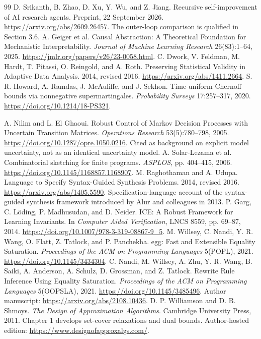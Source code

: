 \documentclass[11pt,oneside,openany]{book}
\numberwithin{equation}{section}
\begin{document}
\begin{thebibliography}{99}
 D. Srikanth, B. Zhao, D. Xu, Y. Wu, and Z. Jiang. Recursive self-improvement of AI research agents. Preprint, 22 September 2026. \url{https://arxiv.org/abs/2609.26457}. The outer-loop comparison is qualified in Section 3.6.
 A. Geiger et al. Causal Abstraction: A Theoretical Foundation for Mechanistic Interpretability. \emph{Journal of Machine Learning Research} 26(83):1--64, 2025. \url{https://jmlr.org/papers/v26/23-0058.html}.
 C. Dwork, V. Feldman, M. Hardt, T. Pitassi, O. Reingold, and A. Roth. Preserving Statistical Validity in Adaptive Data Analysis. 2014, revised 2016. \url{https://arxiv.org/abs/1411.2664}.
 S. R. Howard, A. Ramdas, J. McAuliffe, and J. Sekhon. Time-uniform Chernoff bounds via nonnegative supermartingales. \emph{Probability Surveys} 17:257--317, 2020. \url{https://doi.org/10.1214/18-PS321}.

 A. Nilim and L. El Ghaoui. Robust Control of Markov Decision Processes with Uncertain Transition Matrices. \emph{Operations Research} 53(5):780--798, 2005. \url{https://doi.org/10.1287/opre.1050.0216}. Cited as background on explicit model uncertainty, not as an identical uncertainty model.
 A. Solar-Lezama et al. Combinatorial sketching for finite programs. \emph{ASPLOS}, pp. 404--415, 2006. \url{https://doi.org/10.1145/1168857.1168907}.
 M. Raghothaman and A. Udupa. Language to Specify Syntax-Guided Synthesis Problems. 2014, revised 2016. \url{https://arxiv.org/abs/1405.5590}. Specification-language account of the syntax-guided synthesis framework introduced by Alur and colleagues in 2013.
 P. Garg, C. L\"oding, P. Madhusudan, and D. Neider. ICE: A Robust Framework for Learning Invariants. In \emph{Computer Aided Verification}, LNCS 8559, pp. 69--87, 2014. \url{https://doi.org/10.1007/978-3-319-08867-9_5}.
 M. Willsey, C. Nandi, Y. R. Wang, O. Flatt, Z. Tatlock, and P. Panchekha. egg: Fast and Extensible Equality Saturation. \emph{Proceedings of the ACM on Programming Languages} 5(POPL), 2021. \url{https://doi.org/10.1145/3434304}.
 C. Nandi, M. Willsey, A. Zhu, Y. R. Wang, B. Saiki, A. Anderson, A. Schulz, D. Grossman, and Z. Tatlock. Rewrite Rule Inference Using Equality Saturation. \emph{Proceedings of the ACM on Programming Languages} 5(OOPSLA), 2021. \url{https://doi.org/10.1145/3485496}. Author manuscript: \url{https://arxiv.org/abs/2108.10436}.
 D. P. Williamson and D. B. Shmoys. \emph{The Design of Approximation Algorithms}. Cambridge University Press, 2011. Chapter 1 develops set-cover relaxations and dual bounds. Author-hosted edition: \url{https://www.designofapproxalgs.com/}.
\end{thebibliography}
\end{document}
